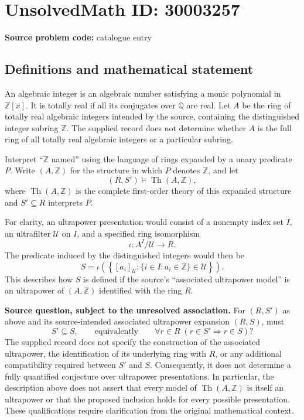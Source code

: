 \documentclass[11pt]{article}
\newcommand{\Z}{\mathbb{Z}}
\newcommand{\Q}{\mathbb{Q}}
\begin{document}
\section*{UnsolvedMath ID: 30003257}
\textbf{Source problem code:} catalogue entry
\subsection{Definitions and mathematical statement}
An algebraic integer is an algebraic number satisfying a monic polynomial in \(\Z[x]\). It is totally real if all its conjugates over \(\Q\) are real. Let \(A\) be the ring of totally real algebraic integers intended by the source, containing the distinguished integer subring \(\Z\). The supplied record does not determine whether \(A\) is the full ring of all totally real algebraic integers or a particular subring.

Interpret ``\(\Z\) named'' using the language of rings expanded by a unary predicate \(P\). Write \((A,\Z)\) for the structure in which \(P\) denotes \(\Z\), and let
\[
(R,S')\models\operatorname{Th}(A,\Z),
\]
where \(\operatorname{Th}(A,\Z)\) is the complete first-order theory of this expanded structure and \(S'\subseteq R\) interprets \(P\).

For clarity, an ultrapower presentation would consist of a nonempty index set \(I\), an ultrafilter \(\mathcal U\) on \(I\), and a specified ring isomorphism
\[
\iota:A^I/\mathcal U\longrightarrow R.
\]
The predicate induced by the distinguished integers would then be
\[
S=\iota\!\left(\left\{[a_i]_{\mathcal U}:\{i\in I:a_i\in\Z\}\in\mathcal U\right\}\right).
\]
This describes how \(S\) is defined if the source's ``associated ultrapower model'' is an ultrapower of \((A,\Z)\) identified with the ring \(R\).

\textbf{Source question, subject to the unresolved association.} For \((R,S')\) as above and its source-intended associated ultrapower expansion \((R,S)\), must
\[
S'\subseteq S,
\qquad\text{equivalently}\qquad
\forall r\in R\;(r\in S'\Longrightarrow r\in S)?
\]
The supplied record does not specify the construction of the associated ultrapower, the identification of its underlying ring with \(R\), or any additional compatibility required between \(S'\) and \(S\). Consequently, it does not determine a fully quantified conjecture over ultrapower presentations. In particular, the description above does not assert that every model of \(\operatorname{Th}(A,\Z)\) is itself an ultrapower or that the proposed inclusion holds for every possible presentation. These qualifications require clarification from the original mathematical context.
\end{document}
